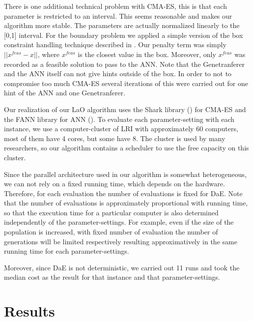 \documentclass{acm_proc_article-sp}
\begin{document}
There is one additional technical problem with CMA-ES, this is that each parameter is restricted to an interval. This seems reasonable and makes our algorithm more stable. The parameters are actually normalized linearly to the [0,1] interval. For the boundary problem we applied a simple version of the box constraint handling technique described in \cite{hansen2009tec}. Our penalty term was simply \begin{math}||x^{feas}-x|| \end{math}, where \begin{math}x^{feas}\end{math} is the closest value in the box. Moreover, only \begin{math}x^{feas}\end{math} was recorded as a feasible solution to pass to the ANN. Note that the Genetranferer and the ANN itself can not give hints outside of the box. In order to not to compromise too much CMA-ES several iterations of this were carried out for one hint of the ANN and one Genetranferer.

Our realization of our LaO algorithm uses the Shark library (\cite{shark08}) for CMA-ES and the FANN library for ANN (\cite{nissen}). To evaluate each parameter-setting with each instance, we use a computer-cluster of LRI with approximately 60 computers, most of them have 4 cores, but some have 8. The cluster is used by many researchers, so our algorithm contains a scheduler to use the free capacity on this cluster.

Since the parallel architecture used in our algorithm is somewhat heterogeneous, we can not rely on a fixed running time, which depends on the hardware. Therefore, for each evaluation the number of evaluations is fixed for DaE. Note that the number of evaluations is approximately proportional with running time, so that the execution time for a particular computer is also determined independently of the parameter-settings. For example, even if the size of the population is increased, with fixed number of evaluation the number of generations will be limited respectively resulting approximatively in the same running time for each parameter-settings. 

Moreover, since DaE is not deterministic, we carried out 11 runs and took the median cost as the result for that instance and that parameter-settings.


\section{Results}
\label{section:results}
\end{document}
